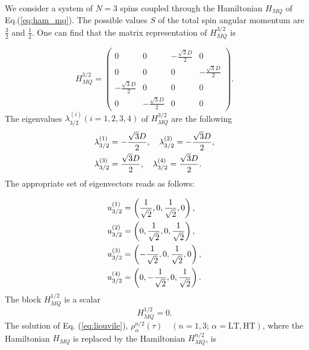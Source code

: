 \documentclass[
    pra,  
    twocolumn, 
    floatfix, 
    amsmath, 
    amssymb, 
    superscriptaddress
]{revtex4-1}
\begin{document}
We consider a system of $N=3$ spins coupled through the Hamiltonian $H_{MQ}$ of Eq.(\ref{eq:ham_mq}). The possible values $S$ of the total spin angular momentum are $\frac 3 2$ and $\frac 1 2$. One can find that the matrix representation of $H_{MQ}^{3/2}$  is 

\begin{equation}
    \label{eq:ham_3_2}
    H_{MQ}^{3/2} = 
    \begin{pmatrix}
        0 & 0 & -\frac{\sqrt{3} D}{2} & 0 \\
        0 & 0 & 0 & -\frac{\sqrt{3} D}{2} \\
        -\frac{\sqrt{3} D}{2} & 0 & 0 & 0 \\
        0 & -\frac{\sqrt{3} D}{2} & 0 & 0 
    \end{pmatrix}.
\end{equation}
The eigenvalues $\lambda_{3/2}^{(i)}(i=1, 2, 3, 4)$ of  $H_{MQ}^{3/2}$ are the following 
\begin{align}
    \label{eq:eigvals_3_2}
    \lambda_{3/2}^{(1)} &= -\frac{\sqrt{3} D}{2}, \quad
    \lambda_{3/2}^{(2)} = -\frac{\sqrt{3} D}{2}, \notag \\
    \lambda_{3/2}^{(3)} &= \frac{\sqrt{3} D}{2}, \quad
    \lambda_{3/2}^{(4)} = \frac{\sqrt{3} D}{2}.
\end{align}
The appropriate set of eigenvectors reads as follows:

\begin{align}
    \label{eq:eigvecs_3_2}
    u_{3/2}^{(1)} & =  \left(\frac{1}{\sqrt{2}}, 0, 
                   \frac{1}{\sqrt{2}}, 0\right) ,
    \notag \\
    u_{3/2}^{(2)} & =  \left(0, \frac{1}{\sqrt{2}}, 
                   0, \frac{1}{\sqrt{2}}\right) ,
    \notag \\
    u_{3/2}^{(3)} & =  \left(-\frac{1}{\sqrt{2}}, 0, 
                   \frac{1}{\sqrt{2}}, 0\right) ,
    \notag \\               
    u_{3/2}^{(4)} & =  \left(0, -\frac{1}{\sqrt{2}}, 
                   0, \frac{1}{\sqrt{2}}\right)  .              
\end{align}
The block $H^{1/2}_{MQ}$ is a scalar
\begin{equation}
    \label{eq:ham_1_2}
    H^{1/2}_{MQ} = 0.
\end{equation}
The solution of Eq.   (\ref{eq:liouvile}), $\rho_{\alpha}^{n/2} (\tau) \quad (n = 1, 3; \, \alpha = \mathrm{LT}, \mathrm{HT})$, where the Hamiltonian $H_{MQ}$ is replaced by the Hamiltonian $H_{MQ}^{n/2}$, is 
\end{document}

